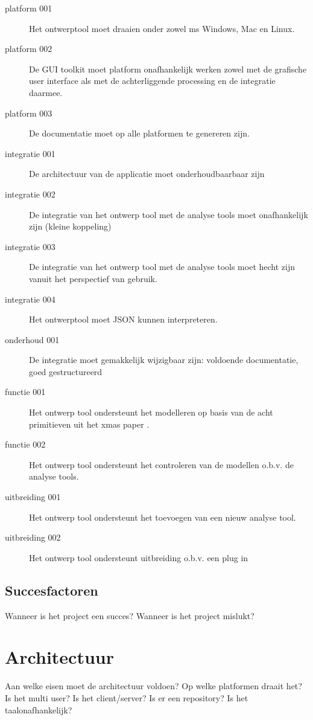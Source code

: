 \documentclass[a4paper,11pt,twoside,draft]{article}
\begin{document}
\begin{description}
 \item[platform 001] Het ontwerptool moet draaien onder zowel ms Windows, Mac en Linux.
 \item[platform 002] De GUI toolkit moet platform onafhankelijk werken zowel met de
 grafische user interface als met de achterliggende processing en de integratie daarmee.
 \item[platform 003] De documentatie moet op alle platformen te genereren zijn.
 \item[integratie 001] De architectuur van de applicatie moet onderhoudbaarbaar zijn
 \item[integratie 002] De integratie van het ontwerp tool met de analyse tools moet onafhankelijk zijn (kleine koppeling)
 \item[integratie 003] De integratie van het ontwerp tool met de analyse tools moet hecht zijn
 vanuit het perspectief van gebruik.
 \item[integratie 004] Het ontwerptool moet JSON kunnen interpreteren.
 \item[onderhoud 001] De integratie moet gemakkelijk wijzigbaar zijn: voldoende documentatie, goed gestructureerd
 \item[functie 001] Het ontwerp tool ondersteunt het modelleren op basis van de acht primitieven uit het xmas paper \cite{chatterjee-kishinevsky:xmas}.
 \item[functie 002] Het ontwerp tool ondersteunt het controleren van de modellen o.b.v. de analyse tools.
 \item[uitbreiding 001] Het ontwerp tool ondersteunt het toevoegen van een nieuw analyse tool.
 \item[uitbreiding 002] Het ontwerp tool ondersteunt uitbreiding o.b.v. een plug in
\end{description}



\subsection{Succesfactoren}
Wanneer is het project een succes?
Wanneer is het project mislukt?

\section{Architectuur}
Aan welke eisen moet de architectuur voldoen?
Op welke platformen draait het?
Is het multi user? Is het client/server? Is er een repository?
Is het taalonafhankelijk?
\end{document}
